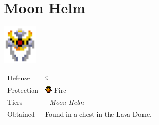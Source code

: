 \section{Moon Helm}
\label{armor:moon_helm}

\includegraphics[height=2cm,keepaspectratio]{./resources/armors/moonhelm}

\begin{longtable}{ l p{9cm} }
	Defense
	& 9
\\ %
	Protection
	& \includegraphics[height=1em,keepaspectratio]{./resources/effects/fire}
	Fire
\\ %
	Tiers
	& \nameref{armor:steel_helm} - \textit{Moon Helm} - \nameref{armor:apollo_helm}
\\ %
	Obtained
	& Found in a chest in the Lava Dome.
\end{longtable}
